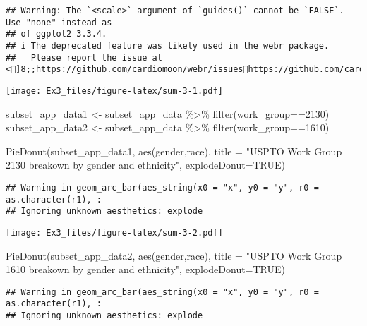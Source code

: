 \documentclass[
]{article}
\newenvironment{Shaded}{\begin{snugshade}}{\end{snugshade}}
\newcommand{\AttributeTok}[1]{\textcolor[rgb]{0.77,0.63,0.00}{#1}}
\newcommand{\ConstantTok}[1]{\textcolor[rgb]{0.00,0.00,0.00}{#1}}
\newcommand{\DecValTok}[1]{\textcolor[rgb]{0.00,0.00,0.81}{#1}}
\newcommand{\FunctionTok}[1]{\textcolor[rgb]{0.00,0.00,0.00}{#1}}
\newcommand{\NormalTok}[1]{#1}
\newcommand{\OtherTok}[1]{\textcolor[rgb]{0.56,0.35,0.01}{#1}}
\newcommand{\SpecialCharTok}[1]{\textcolor[rgb]{0.00,0.00,0.00}{#1}}
\newcommand{\StringTok}[1]{\textcolor[rgb]{0.31,0.60,0.02}{#1}}
\begin{document}
\begin{verbatim}
## Warning: The `<scale>` argument of `guides()` cannot be `FALSE`. Use "none" instead as
## of ggplot2 3.3.4.
## i The deprecated feature was likely used in the webr package.
##   Please report the issue at <]8;;https://github.com/cardiomoon/webr/issueshttps://github.com/cardiomoon/webr/issues]8;;>.
\end{verbatim}

\texttt{[image: Ex3\_files/figure-latex/sum-3-1.pdf]}

\begin{Shaded}
\begin{Highlighting}[]
\NormalTok{subset\_app\_data1 }\OtherTok{\textless{}{-}}\NormalTok{ subset\_app\_data }\SpecialCharTok{\%\textgreater{}\%} \FunctionTok{filter}\NormalTok{(work\_group}\SpecialCharTok{==}\DecValTok{2130}\NormalTok{)}
\NormalTok{subset\_app\_data2 }\OtherTok{\textless{}{-}}\NormalTok{ subset\_app\_data }\SpecialCharTok{\%\textgreater{}\%} \FunctionTok{filter}\NormalTok{(work\_group}\SpecialCharTok{==}\DecValTok{1610}\NormalTok{)}

\FunctionTok{PieDonut}\NormalTok{(subset\_app\_data1, }\FunctionTok{aes}\NormalTok{(gender,race), }\AttributeTok{title =} \StringTok{"USPTO Work Group 2130 breakown by gender and ethnicity"}\NormalTok{, }\AttributeTok{explodeDonut=}\ConstantTok{TRUE}\NormalTok{)}
\end{Highlighting}
\end{Shaded}

\begin{verbatim}
## Warning in geom_arc_bar(aes_string(x0 = "x", y0 = "y", r0 = as.character(r1), :
## Ignoring unknown aesthetics: explode
\end{verbatim}

\texttt{[image: Ex3\_files/figure-latex/sum-3-2.pdf]}

\begin{Shaded}
\begin{Highlighting}[]
\FunctionTok{PieDonut}\NormalTok{(subset\_app\_data2, }\FunctionTok{aes}\NormalTok{(gender,race), }\AttributeTok{title =} \StringTok{"USPTO Work Group 1610 breakown by gender and ethnicity"}\NormalTok{, }\AttributeTok{explodeDonut=}\ConstantTok{TRUE}\NormalTok{)}
\end{Highlighting}
\end{Shaded}

\begin{verbatim}
## Warning in geom_arc_bar(aes_string(x0 = "x", y0 = "y", r0 = as.character(r1), :
## Ignoring unknown aesthetics: explode
\end{verbatim}
\end{document}
